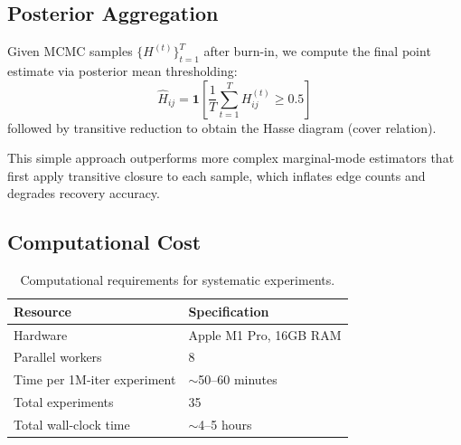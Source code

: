 \subsection{Posterior Aggregation}
\label{app:posterior_agg}

Given MCMC samples $\{H^{(t)}\}_{t=1}^T$ after burn-in, we compute the final point estimate via posterior mean thresholding:
\begin{equation}
\hat{H}_{ij} = \mathbf{1}\left[\frac{1}{T}\sum_{t=1}^T H^{(t)}_{ij} \geq 0.5\right]
\end{equation}
followed by transitive reduction to obtain the Hasse diagram (cover relation).

This simple approach outperforms more complex marginal-mode estimators that first apply transitive closure to each sample, which inflates edge counts and degrades recovery accuracy.

\subsection{Computational Cost}
\label{app:compute}

\begin{table}[h]
\centering
\caption{Computational requirements for systematic experiments.}
\label{tab:compute}
\small
\begin{tabular}{ll}
\toprule
\textbf{Resource} & \textbf{Specification} \\
\midrule
Hardware & Apple M1 Pro, 16GB RAM \\
Parallel workers & 8 \\
Time per 1M-iter experiment & $\sim$50--60 minutes \\
Total experiments & 35 \\
Total wall-clock time & $\sim$4--5 hours \\
\bottomrule
\end{tabular}
\end{table}


